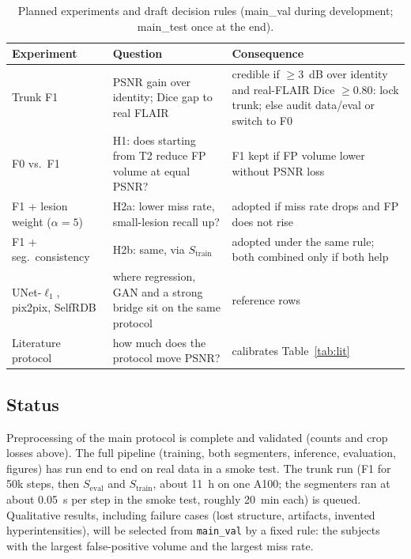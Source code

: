 \documentclass[journal]{IEEEtran}
\newcommand{\Seval}{S_{\mathrm{eval}}}
\newcommand{\Strain}{S_{\mathrm{train}}}
\begin{document}
\begin{table}[t]
\centering
\caption{Planned experiments and draft decision rules (main\_val during development; main\_test once at the end).}
\label{tab:plan}
\footnotesize
\setlength{\tabcolsep}{3pt}
\begin{tabular}{>{\raggedright\arraybackslash}p{}>{\raggedright\arraybackslash}p{}>{\raggedright\arraybackslash}p{}}
\toprule
Experiment & Question & Consequence \\
\midrule
Trunk F1 & PSNR gain over identity; Dice gap to real FLAIR & credible if $\geq$3~dB over identity and real-FLAIR Dice $\geq0.80$: lock trunk; else audit data/eval or switch to F0 \\
F0 vs.\ F1 & H1: does starting from T2 reduce FP volume at equal PSNR? & F1 kept if FP volume lower without PSNR loss \\
F1 + lesion weight ($\alpha{=}5$) & H2a: lower miss rate, small-lesion recall up? & adopted if miss rate drops and FP does not rise \\
F1 + seg.\ consistency & H2b: same, via $\Strain$ & adopted under the same rule; both combined only if both help \\
UNet-$\ell_1$, pix2pix, SelfRDB & where regression, GAN and a strong bridge sit on the same protocol & reference rows \\
Literature protocol & how much does the protocol move PSNR? & calibrates Table~\ref{tab:lit} \\
\bottomrule
\end{tabular}
\end{table}

\subsection{Status}
Preprocessing of the main protocol is complete and validated (counts and crop losses above). The full pipeline (training,
both segmenters, inference, evaluation, figures) has run end to end on real data in a smoke test. The trunk run (F1 for 50k
steps, then $\Seval$ and $\Strain$, about 11~h on one A100; the segmenters ran at about 0.05~s per step in the smoke test, roughly 20~min each) is queued. Qualitative results, including failure cases (lost
structure, artifacts, invented hyperintensities), will be selected from \texttt{main\_val} by a fixed rule: the subjects with
the largest false-positive volume and the largest miss rate.

\end{document}
